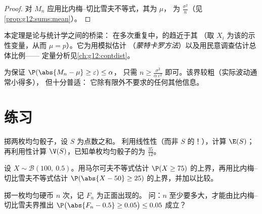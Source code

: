 \begin{proof}
对 $M_n$ 应用比内梅–切比雪夫不等式，其为 $\mu$，
为 $\frac{\sigma^2}{n}$（见\cref{prop:g12:sums:mean}）。
\end{proof}

\begin{remark}
本定理是论与统计学之间的桥梁：
在多次重复中，的\emph{}趋近于其
\emph{}（取 $X_i$ 为该的示性变量，从而
$\mu = p$）。它为用模拟估计
（\emph{蒙特卡罗方法}）以及用民意调查估计总体比例——
定量分析见\cref{ch:g12:contdist}。
\end{remark}

\begin{method}\label{met:g12:sums:chebyshev}
为保证 $\P(\abs{M_n - \mu} \geq \varepsilon) \leq \alpha$，
只需 $n \geq \frac{\sigma^2}{\alpha\,\varepsilon^2}$ 即可。该界较粗（实际波动通常小得多），
但十分普适：
它除有限外不要求的任何其他信息。
\end{method}

\section{练习}

\begin{exercise}[$\star$]\label{exo:g12:sums:1}
掷两枚均匀骰子，设 $S$ 为点数之和。
利用线性性（而非 $S$ 的！），计算 $\E(S)$；
再利用性计算 $\V(S)$，已知单枚均匀骰子的为 $\frac{35}{12}$。
\end{exercise}

\begin{exercise}[$\star$]\label{exo:g12:sums:2}
设 $X \sim \mathcal B(100,\ 0.5)$。用马尔可夫不等式估计
$\P(X \geq 75)$ 的上界，再用比内梅–切比雪夫不等式估计
$\P(\abs{X - 50} \geq 25)$ 的上界，并加以比较。
\end{exercise}

\begin{exercise}[$\star$]\label{exo:g12:sums:3}
掷一枚均匀硬币 $n$ 次，记 $F_n$ 为正面出现的。
问：$n$ 至少要多大，才能由比内梅–切比雪夫界推出
$\P\bigl(\abs{F_n - 0.5} \geq 0.05\bigr) \leq 0.05$ 成立？
\end{exercise}

